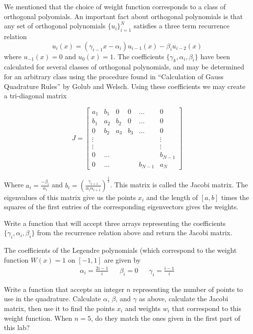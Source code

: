 We mentioned that the choice of weight function corresponds to a class of orthogonal polyomials.
An important fact about orthogonal polynomials is that any set of orthogonal polynomials $\{u_i\}_{i=1}^{N}$ satisfies a three term recurrence relation
\[
u_{i}(x) = (\gamma_{i-1}x-\alpha_i)u_{i-1}(x) - \beta_iu_{i-2}(x)
\]
where $u_{-1}(x) = 0$ and $u_0(x) = 1$.
The coefficients $\{\gamma_k, \alpha_i, \beta_i\}$ have been calculated for several classes of orthogonal polynomials, and may be determined for an arbitrary class using the procedure found in ``Calculation of Gauss Quadrature Rules'' by Golub and Welsch.
Using these coefficients we may create a tri-diagonal matrix

\[
J = \begin{bmatrix}

a_1 & b_1 & 0 & 0 & ... & 0 \\
b_1 & a_2 & b_2 & 0 & ... & 0 \\
0 & b_2 & a_3 & b_3 & ... & 0 \\
\vdots & & & & & \vdots \\
\vdots & & & & & \vdots \\
0 & ... & & & & b_{N-1} \\
0 & ... & & & b_{N-1} & a_N

\end{bmatrix}
\]

Where $a_i = \frac{-\beta_i}{\alpha_i}$ and $b_i = (\frac{\gamma_{i+1}}{\alpha_i \alpha_{i+1}})^{\frac{1}{2}}$.
This matrix is called the Jacobi matrix.
The eigenvalues of this matrix give us the points $x_i$ and the length of $\left[a, b\right]$ times the squares of the first entries of the corresponding eigenvectors gives the weights.

\begin{problem}
Write a function that will accept three arrays representing the coefficients $\{\gamma_i, \alpha_i, \beta_i\}$ from the recurrence relation above and return the Jacobi matrix.
\end{problem}

\begin{problem}
The coefficients of the Legendre polynomials (which correspond to the weight function $W(x) = 1$ on $[-1,1]$ are given by
\begin{align}\nonumber
\alpha_i = \frac{2i - 1}{i} && \beta_i = 0 && \gamma_i = \frac{i-1}{i}
\end{align}

Write a function that accepts an integer $n$ representing the number of points to use in the quadrature. Calculate $\alpha$, $\beta$, and $\gamma$ as above, calculate the Jacobi matrix, then use it to find the points $x_i$ and weights $w_i$ that correspond to this weight function.
When $n=5$, do they match the ones given in the first part of this lab?

\end{problem}


